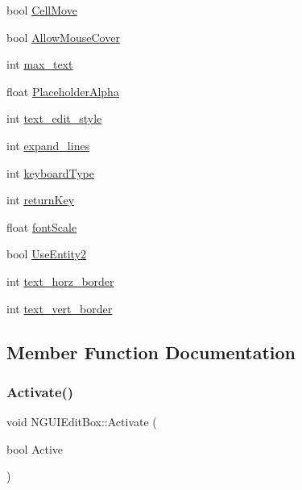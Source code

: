 \begin{DoxyCompactItemize}
\item 
bool \hyperlink{class_n_g_u_i_edit_box_ab336981518b45b444add47fb8c0ce2f9}{Cell\+Move}
\item 
bool \hyperlink{class_n_g_u_i_edit_box_a3f3ef4724afd733375ce03f109904506}{Allow\+Mouse\+Cover}
\item 
int \hyperlink{class_n_g_u_i_edit_box_af367597013f224494b25a77c1bca615e}{max\+\_\+text}
\item 
float \hyperlink{class_n_g_u_i_edit_box_af5a48d142943482910cc7bb2076ff0fb}{Placeholder\+Alpha}
\item 
int \hyperlink{class_n_g_u_i_edit_box_adef2abbaa77bad5eed292da9873757e3}{text\+\_\+edit\+\_\+style}
\item 
int \hyperlink{class_n_g_u_i_edit_box_a1c773d3a8640079d92ddceca639430c4}{expand\+\_\+lines}
\item 
int \hyperlink{class_n_g_u_i_edit_box_a3e33d881e86071236163f71ac32714c6}{keyboard\+Type}
\item 
int \hyperlink{class_n_g_u_i_edit_box_a621a77b40bd43539a9ceb0fc87c35c09}{return\+Key}
\item 
float \hyperlink{class_n_g_u_i_edit_box_a88a2ed074caa9a29805450e29b0fa6fc}{font\+Scale}
\item 
bool \hyperlink{class_n_g_u_i_edit_box_a338f36a684fd9b6313a7e9218e17b4f4}{Use\+Entity2}
\item 
int \hyperlink{class_n_g_u_i_edit_box_a4b2ede32a8f6d5e8b7ffc95dff793564}{text\+\_\+horz\+\_\+border}
\item 
int \hyperlink{class_n_g_u_i_edit_box_ad3ea04068be33487fe1bb6357caf478b}{text\+\_\+vert\+\_\+border}
\end{DoxyCompactItemize}


\subsection{Member Function Documentation}
\hypertarget{class_n_g_u_i_edit_box_ad24a652c1cd47b61f1d0aa68b452f6f4}{}\label{class_n_g_u_i_edit_box_ad24a652c1cd47b61f1d0aa68b452f6f4} 
\subsubsection{\texorpdfstring{Activate()}{Activate()}}
{\footnotesize\ttfamily void N\+G\+U\+I\+Edit\+Box\+::\+Activate (\begin{DoxyParamCaption}\item[{bool}]{Active }\end{DoxyParamCaption})}


